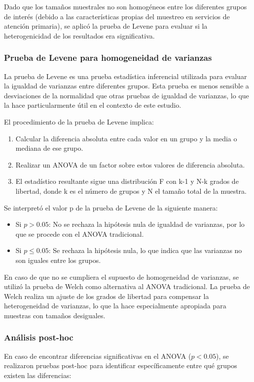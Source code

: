 \documentclass[11pt,letterpaper]{report}
\begin{document}
Dado que los tamaños muestrales no son homogéneos entre los diferentes grupos de
interés (debido a las características propias del muestreo en servicios de
atención primaria), se aplicó la prueba de Levene para evaluar si la
heterogenicidad de los resultados era significativa. 

\subsubsection{Prueba de Levene para homogeneidad de varianzas}
La prueba de Levene es una prueba estadística inferencial utilizada para
evaluar la igualdad de varianzas entre diferentes grupos. Esta prueba es menos
sensible a desviaciones de la normalidad que otras pruebas de igualdad de
varianzas, lo que la hace particularmente útil en el contexto de este estudio.

El procedimiento de la prueba de Levene implica:
\begin{enumerate}
    \item Calcular la diferencia absoluta entre cada valor en un grupo y la
		media o mediana de ese grupo.
    \item Realizar un ANOVA de un factor sobre estos valores de diferencia
		absoluta.
    \item El estadístico resultante sigue una distribución F con k-1 y N-k
		grados de libertad, donde k es el número de grupos y N el tamaño total
		de la muestra.
\end{enumerate}

Se interpretó el valor p de la prueba de Levene de la siguiente manera:
\begin{itemize}
    \item Si $p > 0.05$: No se rechaza la hipótesis nula de igualdad de
		varianzas, por lo que se procede con el ANOVA tradicional.
    \item Si $p \leq0.05$: Se rechaza la hipótesis nula, lo que indica que las
		varianzas no son iguales entre los grupos.
\end{itemize}

En caso de que no se cumpliera el supuesto de homogeneidad de varianzas, se
utilizó la prueba de Welch como alternativa al ANOVA tradicional. La prueba de
Welch realiza un ajuste de los grados de libertad para compensar la
heterogeneidad de varianzas, lo que la hace especialmente apropiada para
muestras con tamaños desiguales.

\subsubsection{Análisis post-hoc}
En caso de encontrar diferencias significativas en el ANOVA ($p < 0.05$), se
realizaron pruebas post-hoc para identificar específicamente entre qué grupos
existen las diferencias:
\end{document}

